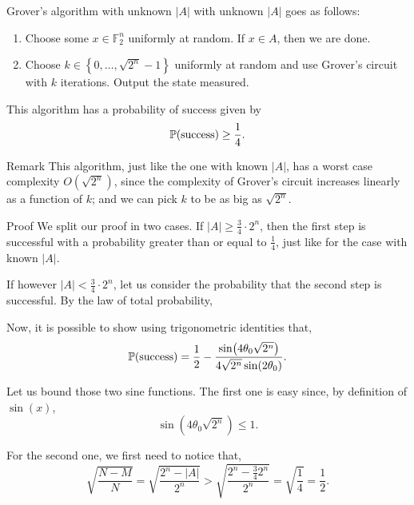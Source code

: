 \documentclass[a4paper]{article}
\begin{document}
\begin{parag}{Grover's algorithm with unknown $\left|A\right|$}
     with unknown $\left|A\right|$ goes as follows:
    \begin{enumerate}
        \item Choose some $x \in \mathbb{F}_2^n$ uniformly at random. If $x \in A$, then we are done.
        \item Choose $k \in \left\{0, \ldots, \sqrt{2^n} - 1\right\}$ uniformly at random and use Grover's circuit with $k$ iterations. Output the state measured.
    \end{enumerate}

    This algorithm has a probability of success given by
    \[\prob\left(\text{success}\right) \geq \frac{1}{4}.\]

    \begin{subparag}{Remark}
        This algorithm, just like the one with known $\left|A\right|$, has a worst case complexity $O\left(\sqrt{2^n}\right)$, since the complexity of Grover's circuit increases linearly as a function of $k$; and we can pick $k$ to be as big as $\sqrt{2^n}$.
    \end{subparag}

    \begin{subparag}{Proof}
        We split our proof in two cases. If $\left|A\right| \geq \frac{3}{4}\cdot  2^n$, then the first step is successful with a probability greater than or equal to $\frac{1}{4}$, just like for the case with known $\left|A\right|$.

        If however $\left|A\right| < \frac{3}{4}\cdot  2^n$, let us consider the probability that the second step is successful. By the law of total probability, 

        Now, it is possible to show using trigonometric identities that, 
        \[\prob\left(\text{success}\right) = \frac{1}{2} - \frac{\sin\left(4 \theta_0 \sqrt{2^n}\right)}{4 \sqrt{2^n} \sin\left(2\theta_0\right)}.\]

        Let us bound those two sine functions. The first one is easy since, by definition of $\sin\left(x\right)$, 
        \[\sin\left(4 \theta_0 \sqrt{2^n}\right) \leq 1.\]

        For the second one, we first need to notice that,
        \[\sqrt{\frac{N-M}{N}} = \sqrt{\frac{2^n - \left|A\right|}{2^n}} > \sqrt{\frac{2^n - \frac{3}{4}2^n}{2^n}} = \sqrt{\frac{1}{4}} = \frac{1}{2}.\]


\end{subparag}
\end{parag}
\end{document}
